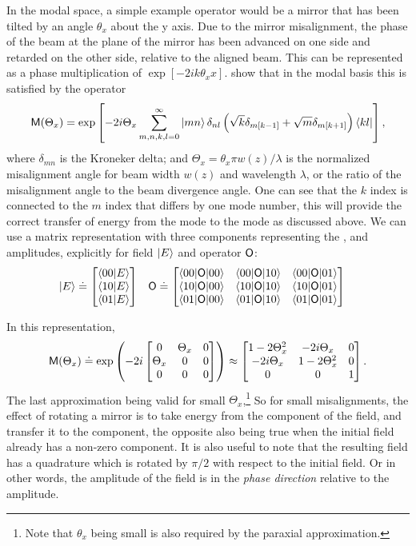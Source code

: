 In the modal space, a simple example operator would be a mirror that has been tilted by an angle $\theta_x$ about the y axis. %
Due to the mirror misalignment, the phase of the beam at the plane of the mirror has been advanced on one side and retarded on the other side, relative to the aligned beam. %
This can be represented as a phase multiplication of $\exp[-2ik\theta_x x]$. %
\citet{Hefetz:97} show that in the modal basis this is satisfied by the operator
\begin{equation}
\mathsf{M}(\Theta_x) = \exp\left[ -2i\Theta_x\sum_{m,n,k,l=0}^\infty \left| mn \right> \delta_{nl} \left( \sqrt k \delta_{m[k-1]}+\sqrt m \delta_{m[k+1]} \right) \left< kl \right|\right],
\end{equation}
where $\delta_{mn}$ is the Kroneker delta; and $\Theta_x = \theta_x \pi w(z)/\lambda$ is the normalized misalignment angle for beam width $w(z)$ and wavelength $\lambda$, or the ratio of the misalignment angle to the beam divergence angle. %
One can see that the $k$ index is connected to the $m$ index that differs by one mode number, this will provide the correct transfer of energy from the  mode to the  mode as discussed above. %
We can use a matrix representation with three components representing the ,  and  amplitudes, explicitly for field $\left| E \right>$ and operator $\mathsf{O}$:
\begin{align}
\vect{E} &\doteq \ms \inprod{00}{E} \\ \inprod{10}{E} \\ \inprod{01}{E} \me
& \oper{O} &\doteq \ms 
\matrixel{00}{\oper{O}}{00} & \matrixel{00}{\oper{O}}{10} & \matrixel{00}{\oper{O}}{01} \\
\matrixel{10}{\oper{O}}{00} & \matrixel{10}{\oper{O}}{10} & \matrixel{10}{\oper{O}}{01} \\
\matrixel{01}{\oper{O}}{00} & \matrixel{01}{\oper{O}}{10} & \matrixel{01}{\oper{O}}{01} \me
\end{align}

In this representation, 
\begin{equation}
\mathsf{M}(\Theta_x) \doteq \exp \left( -2i 
\left[\begin{matrix} 
0 & \Theta_x & 0 \\
\Theta_x & 0 & 0 \\
0 & 0 & 0 
\end{matrix}\right]
\right)
\approx
\left[\begin{matrix}
1-2\Theta_x^2 & -2i\Theta_x& 0 \\
-2i\Theta_x & 1-2\Theta_x^2& 0 \\
0 & 0 & 1 \\
\end{matrix}\right] .
\end{equation}
The last approximation being valid for small $\Theta_x$,\footnote{Note that $\theta_x$ being small is also required by the paraxial approximation.}
So for small misalignments, the effect of rotating a mirror is to take energy from the  component of the field, and transfer it to the  component, the opposite also being true when the initial field already has a non-zero  component. %
It is also useful to note that the resulting  field has a quadrature which is rotated by $\pi/2$ with respect to the initial  field. %
Or in other words, the amplitude of the  field is in the \emph{phase direction} relative to the  amplitude.

